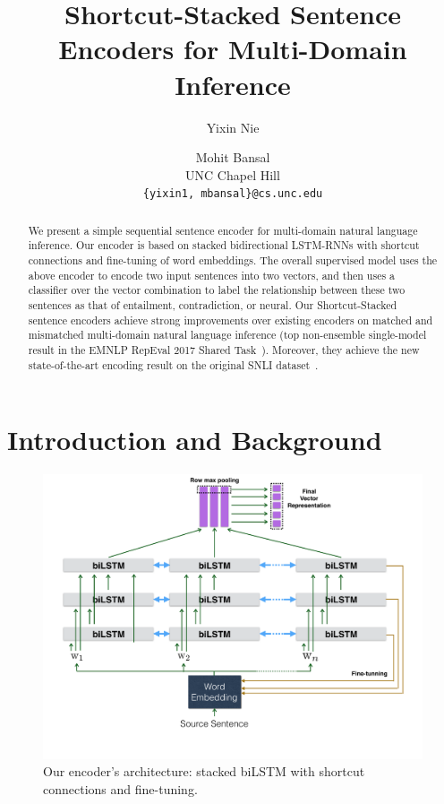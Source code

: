 \documentclass[11pt,letterpaper]{article}
\title{Shortcut-Stacked Sentence Encoders for Multi-Domain Inference}
\author{Yixin Nie \and Mohit Bansal \\
        UNC Chapel Hill\\
        \texttt{\{yixin1, mbansal\}@cs.unc.edu}
        }
\date{}
\begin{document}
\maketitle

\begin{abstract}
We present a simple sequential sentence encoder for multi-domain natural language inference. Our encoder is based on stacked bidirectional LSTM-RNNs with shortcut connections and fine-tuning of word embeddings. The overall supervised  model uses the above encoder to encode two input sentences into two vectors, and then uses a classifier over the vector combination to label the relationship between these two sentences as that of entailment, contradiction, or neural. Our Shortcut-Stacked sentence encoders achieve strong improvements over existing encoders on matched and mismatched multi-domain natural language inference (top non-ensemble single-model result in the EMNLP RepEval 2017 Shared Task~\cite{nangia2017repeval}). Moreover, they achieve the new state-of-the-art encoding result on the original SNLI dataset~\cite{snli:emnlp2015}.


\end{abstract}


\section{Introduction and Background}

\begin{figure}[ht!]
\centering
\includegraphics[width=140mm]{model_fig.pdf}
\vspace{-35pt}
\caption{Our encoder's architecture: stacked biLSTM with shortcut connections and fine-tuning.\label{fig:model}}
\end{figure}
\end{document}
